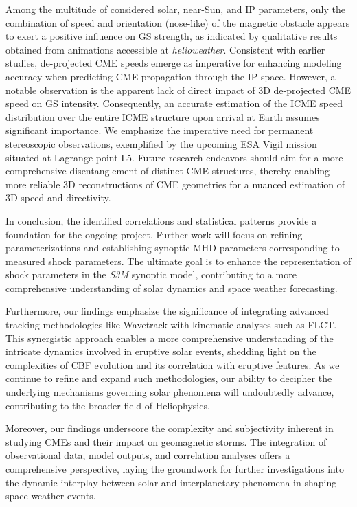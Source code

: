 Among the multitude of considered solar, near-Sun, and IP parameters, only the combination of speed and orientation (nose-like) of the magnetic obstacle appears to exert a positive influence on GS strength, as indicated by qualitative results obtained from animations accessible at \textit{helioweather}. Consistent with earlier studies, de-projected CME speeds emerge as imperative for enhancing modeling accuracy when predicting CME propagation through the IP space. However, a notable observation is the apparent lack of direct impact of 3D de-projected CME speed on GS intensity. Consequently, an accurate estimation of the ICME speed distribution over the entire ICME structure upon arrival at Earth assumes significant importance. We emphasize the imperative need for permanent stereoscopic observations, exemplified by the upcoming ESA Vigil mission situated at Lagrange point L5. Future research endeavors should aim for a more comprehensive disentanglement of distinct CME structures, thereby enabling more reliable 3D reconstructions of CME geometries for a nuanced estimation of 3D speed and directivity.

In conclusion, the identified correlations and statistical patterns provide a foundation for the ongoing project. Further work will focus on refining parameterizations and establishing synoptic MHD parameters corresponding to measured shock parameters. The ultimate goal is to enhance the representation of shock parameters in the \textit{S3M} synoptic model, contributing to a more comprehensive understanding of solar dynamics and space weather forecasting.

Furthermore, our findings emphasize the significance of integrating advanced tracking methodologies like Wavetrack with kinematic analyses such as FLCT. This synergistic approach enables a more comprehensive understanding of the intricate dynamics involved in eruptive solar events, shedding light on the complexities of CBF evolution and its correlation with eruptive features. As we continue to refine and expand such methodologies, our ability to decipher the underlying mechanisms governing solar phenomena will undoubtedly advance, contributing to the broader field of Heliophysics.

Moreover, our findings underscore the complexity and subjectivity inherent in studying CMEs and their impact on geomagnetic storms. The integration of observational data, model outputs, and correlation analyses offers a comprehensive perspective, laying the groundwork for further investigations into the dynamic interplay between solar and interplanetary phenomena in shaping space weather events.
